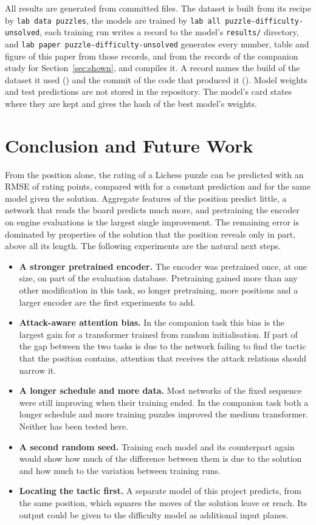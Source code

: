 \documentclass[11pt]{article}
\begin{document}
All results are generated from committed files. The dataset is built from
its recipe by \texttt{lab data puzzles}, the models are trained by
\texttt{lab all puzzle-difficulty-unsolved}, each training run writes a
record to the model's \texttt{results/} directory, and
\texttt{lab paper puzzle-difficulty-unsolved} generates every number, table
and figure of this paper from those records, and from the records of the
companion study for Section~\ref{sec:shown}, and compiles it. A record names
the build of the dataset it used () and the commit of
the code that produced it (). Model weights and test
predictions are not stored in the repository. The model's card states where
they are kept and gives the hash of the best model's weights.

\section{Conclusion and Future Work}
\label{sec:conclusion}

From the position alone, the rating of a Lichess puzzle can be predicted with
an RMSE of  rating points, compared with  for a
constant prediction\ifshown{} and  for the same model
given the solution\fi. Aggregate features of the position predict little, a
network that reads the board predicts much more, and pretraining the encoder
on engine evaluations is the largest single improvement. The remaining error
is dominated by properties of the solution that the position reveals only in
part, above all its length. The following experiments are the natural next
steps.
\begin{itemize}
\item \textbf{A stronger pretrained encoder.} The encoder was pretrained
once, at one size, on part of the evaluation database. Pretraining gained
more than any other modification in this task, so longer pretraining, more
positions and a larger encoder are the first experiments to add.
\item \textbf{Attack-aware attention bias.} In the companion task this bias
is the largest gain for a transformer trained from random initialisation.
If part of the gap between the two tasks is due to the network failing to
find the tactic that the position contains, attention that receives the
attack relations should narrow it.
\item \textbf{A longer schedule and more data.} Most networks of the fixed
sequence were still improving when their training ended. In the companion
task both a longer schedule and more training puzzles improved the medium
transformer. Neither has been tested here.
\item \textbf{A second random seed.} Training each model and its counterpart
again would show how much of the difference between them is due to the
solution and how much to the variation between training runs.
\item \textbf{Locating the tactic first.} A separate model of this project
predicts, from the same position, which squares the moves of the solution
leave or reach. Its output could be given to the difficulty model as
additional input planes.
\end{itemize}
\end{document}
